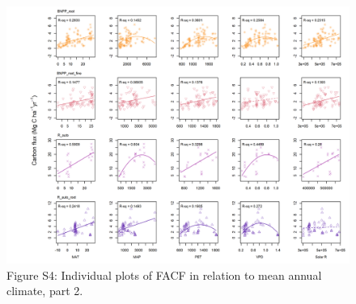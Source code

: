 \documentclass[]{article}
\begin{document}
\newpage

\begin{figure}[H]
\includegraphics[width=41.67in,height=0.95\textheight]{tables_figures/grid_plots_climate2} \caption{Figure S4: Individual plots of FACF in relation to mean annual climate, part 2.}\label{fig:unnamed-chunk-10}
\end{figure}

\elandscape
\end{document}
